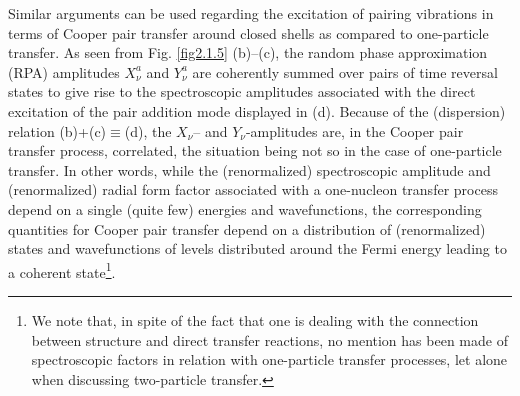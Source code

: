 Similar arguments can be used regarding the excitation of pairing vibrations in terms of Cooper pair transfer around closed shells as compared to one-particle transfer. As seen from Fig. \ref{fig2.1.5} (b)--(c), the random phase approximation (RPA) amplitudes $X_\nu^a$ and $Y^a_\nu$ are coherently summed over pairs of time reversal states to give rise to the spectroscopic amplitudes associated with the direct excitation of the pair addition mode displayed in (d). Because of the (dispersion) relation (b)+(c)$\equiv$(d), the $X_\nu$-- and $Y_\nu$-amplitudes are, in the Cooper pair transfer process, correlated, the situation being not so in the case of one-particle transfer. In other words, while the (renormalized) spectroscopic amplitude and (renormalized) radial form factor associated with a one-nucleon transfer process depend on a single (quite few) energies and wavefunctions, the corresponding quantities for Cooper pair transfer depend on a distribution of (renormalized) states and  wavefunctions of levels distributed around the Fermi energy leading to a coherent state\footnote{We note that, in spite of the fact that one is dealing with the connection between structure and direct transfer reactions, no mention has been made of spectroscopic factors in relation with one-particle transfer processes, let alone when discussing two-particle transfer.}. 
